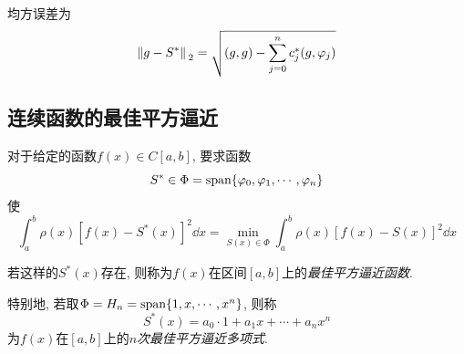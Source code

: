 均方误差为
\begin{equation*}
    \norm*{g-S^*}_2=\sqrt{(g,g)-\sum_{j=0}^nc_j^*(g,\varphi_j)}
\end{equation*}

\subsection{连续函数的最佳平方逼近}

对于给定的函数$f(x)\in C[a,b]$, 要求函数
\begin{equation*}
    S^*\in\Phi=\text{span}\{\varphi_0,\varphi_1,\cdots,\varphi_n\}
\end{equation*}
使
\begin{equation*}
    \int_a^b\rho(x)\left[f(x)-S^*(x)\right]^2\dd{x}=\min_{S(x)\in\Phi}\int_a^b\rho(x)\left[f(x)-S(x)\right]^2\dd{x}
\end{equation*}

若这样的$S^*(x)$存在, 则称为$f(x)$在区间$[a,b]$上的\emph{最佳平方逼近函数}.

特别地, 若取$\Phi=H_n=\text{span}\{1,x,\cdots,x^n\}$, 则称
\begin{equation*}
    S^*(x)=a_0\cdot1+a_1x+\cdots+a_nx^n
\end{equation*}
为$f(x)$在$[a,b]$上的\emph{$n$次最佳平方逼近多项式}.

